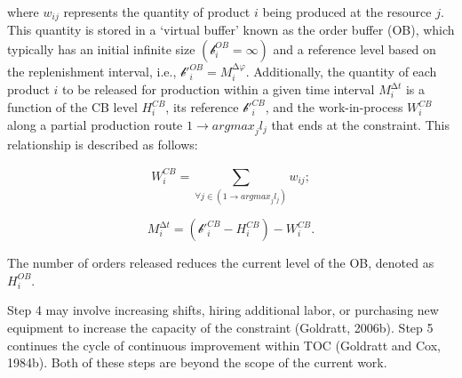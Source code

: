 where \(w_{ij}\) represents the quantity of product \(i\) being produced
at the resource \(j\). This quantity is stored in a `virtual buffer'
known as the order buffer (OB), which typically has an initial infinite
size \(\left( \mathcal{b}_{i}^{OB} = \infty \right)\) and a reference
level based on the replenishment interval, i.e.,
\({\mathcal{b}'}_{i}^{OB} = M_{i}^{\mathrm{\Delta}\varphi}\).
Additionally, the quantity of each product \(i\) to be released for
production within a given time interval \(M_{i}^{\mathrm{\Delta}t}\) is
a function of the CB level \(H_{i}^{CB}\), its reference
\(\mathcal{b'}_{i}^{CB}\), and the work-in-process \(W_{i}^{CB}\) along
a partial production route \(1 \rightarrow {argmax}_{j}l_{j}\) that ends
at the constraint. This relationship is described as follows:

\begin{equation}
W_{i}^{CB} = \sum_{\forall j \in \left( 1 \rightarrow {argmax}_{j}l_{j} \right)}^{}w_{ij};
\tag{18}
\end{equation}

\begin{equation}
M_{i}^{\mathrm{\Delta}t} = \left( \mathcal{b'}_{i}^{CB} - H_{i}^{CB} \right) - W_{i}^{CB}.
\tag{19}
\end{equation}

The number of orders released reduces the current level of the OB,
denoted as \(H_{i}^{OB}\).

Step 4 may involve increasing shifts, hiring additional labor, or
purchasing new equipment to increase the capacity of the constraint
(Goldratt, 2006b). Step 5 continues the cycle of continuous improvement
within TOC (Goldratt and Cox, 1984b). Both of these steps are beyond the
scope of the current work.
